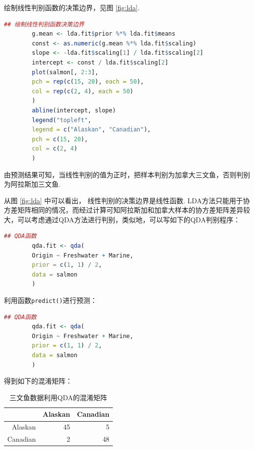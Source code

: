 \documentclass[12pt, a4paper, oneside]{ctexart}
\begin{document}
	绘制线性判别函数的决策边界，见图 \ref{fig:lda}.
	\begin{lstlisting}[language=R]
		## 绘制线性判别函数决策边界
		g.mean <- lda.fit$prior %*% lda.fit$means
		const <- as.numeric(g.mean %*% lda.fit$scaling)
		slope <- -lda.fit$scaling[1] / lda.fit$scaling[2]
		intercept <- const / lda.fit$scaling[2]
		plot(salmon[, 2:3],
		pch = rep(c(15, 20), each = 50),
		col = rep(c(2, 4), each = 50)
		)
		abline(intercept, slope)
		legend("topleft",
		legend = c("Alaskan", "Canadian"),
		pch = c(15, 20),
		col = c(2, 4)
		)
	\end{lstlisting}
	由预测结果可知，当线性判别的值为正时，把样本判别为加拿大三文鱼，否则判别为阿拉斯加三文鱼.
	
	从图 \ref{fig:lda} 中可以看出， 线性判别的决策边界是线性函数. LDA方法只能用于协方差矩阵相同的情况，而经过计算可知阿拉斯加和加拿大样本的协方差矩阵差异较大，可以考虑通过QDA方法进行判别，类似地，可以写如下的QDA判别程序：
	\begin{lstlisting}[language=R]
		## QDA函数
		qda.fit <- qda(
		Origin ~ Freshwater + Marine,
		prior = c(1, 1) / 2,
		data = salmon
		)
	\end{lstlisting}
	利用函数\texttt{predict()}进行预测：
	\begin{lstlisting}[language=R]
		## QDA函数
		qda.fit <- qda(
		Origin ~ Freshwater + Marine,
		prior = c(1, 1) / 2,
		data = salmon
		)
	\end{lstlisting}
	得到如下的混淆矩阵：
	
	\begin{table}[ht]
		\caption{三文鱼数据利用QDA的混淆矩阵}
		\centering
		\begin{tabular}{rrr}
			\hline
			& Alaskan & Canadian \\
			\hline
			Alaskan &  45 &   5 \\
			Canadian &   2 &  48 \\
			\hline
		\end{tabular}
	\end{table}
	
\end{document}
